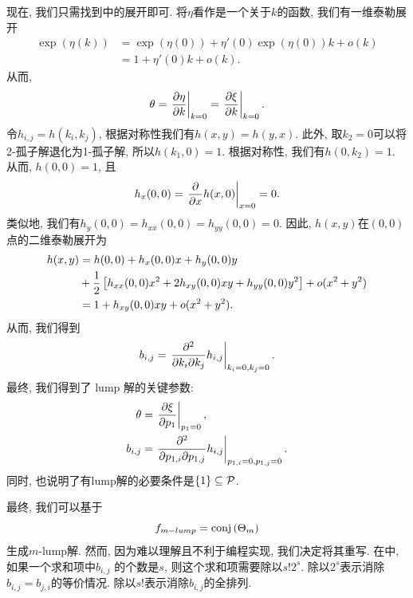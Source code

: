 现在, 我们只需找到中的展开即可. 将$\eta$看作是一个关于$k$的函数, 我们有一维泰勒展开  
\begin{equation}
\begin{split}
\exp(\eta(k))&=\exp(\eta(0))+\eta'(0)\exp(\eta(0))k+o(k)\\ 
&=1+\eta'(0)k+o(k). 
\end{split}
\end{equation}
从而, 
\begin{equation}
\theta=\left.{\frac{\partial \eta}{\partial k}}\right|_{k=0}=\left.{\frac{\partial \xi}{\partial k}}\right|_{k=0}.
\end{equation}
令$h_{i,j}=h(k_i,k_j)$, 根据对称性我们有$h(x,y)=h(y,x)$. 此外, 取$k_2=0$可以将2-孤子解退化为1-孤子解, 所以$h(k_1,0)=1$. 根据对称性, 我们有$h(0,k_2)=1$. 从而, $h(0,0)=1$, 且
\begin{equation}
    h_x(0,0)=\left.{\frac{\partial}{\partial x}h(x,0)}\right|_{x=0}=0.
\end{equation}
类似地, 我们有$h_y(0,0)=h_{xx}(0,0)=h_{yy}(0,0)=0$. 因此, $h(x,y)$在$(0,0)$点的二维泰勒展开为 
\begin{equation}
\begin{split}
h(x,y)&=h(0,0)+h_x(0,0)x+h_y(0,0)y \\ 
&+\frac{1}{2}\left[h_{xx}(0,0)x^2+2h_{xy}(0,0)xy+h_{yy}(0,0)y^2\right]+o(x^2+y^2) \\ 
&=1+h_{xy}(0,0)xy+o(x^2+y^2).
\end{split}
\end{equation}
从而, 我们得到
\begin{equation}
    b_{i,j}=\left.{\frac{\partial^2}{\partial k_i\partial k_j}h_{i,j}}\right|_{k_i=0,k_j=0}.
\end{equation}
最终, 我们得到了 lump 解的关键参数:
\begin{equation}
\begin{split}
    \theta &= \left.{\frac{\partial \xi}{\partial p_1}}\right|_{p_1=0}, \\
    b_{i,j}&= \left.{\frac{\partial^2}{\partial p_{1,i}\partial p_{1,j}}h_{i,j}}\right|_{p_{1,i}=0,p_{1,j}=0}.
\end{split} \label{p-lump}
\end{equation}
同时, 也说明了有lump解的必要条件是$\left\{1\right\}\subseteq \mathcal{P}$.

最终, 我们可以基于
\begin{equation}
    f_{m-lump}={\rm conj}\left(\Theta_m\right)
\end{equation}
生成$m$-lump解. 然而, 因为难以理解且不利于编程实现, 我们决定将其重写. 在中, 如果一个求和项中$b_{i,j}$ 的个数是$s$, 则这个求和项需要除以$s!2^s$. 除以$2^s$表示消除$b_{i,j}=b_{j,i}$的等价情况. 除以$s!$表示消除$b_{i,j}$的全排列.  

